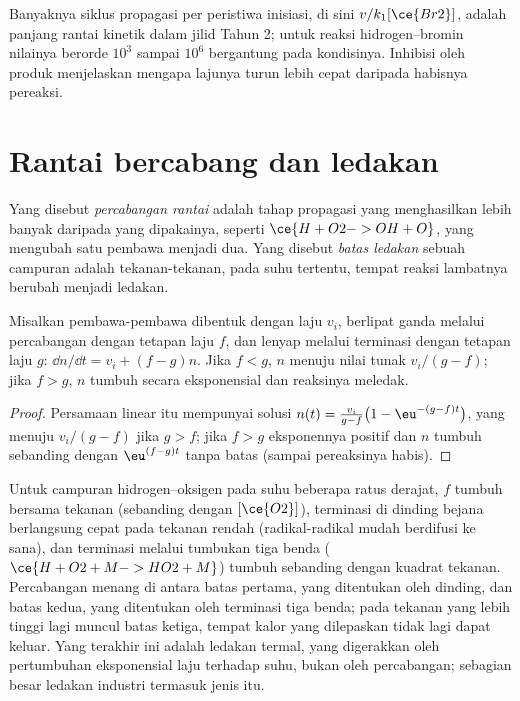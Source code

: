 Banyaknya siklus propagasi per peristiwa inisiasi, di sini $v/k_1[\ce{Br2}]$,
adalah panjang rantai kinetik dalam jilid Tahun 2; untuk reaksi
hidrogen--bromin nilainya berorde $10^3$ sampai $10^6$ bergantung pada
kondisinya. Inhibisi oleh produk menjelaskan mengapa lajunya turun lebih
cepat daripada habisnya pereaksi.

\section{Rantai bercabang dan ledakan}

\begin{definition}\label{def:b3:complex-kinetics:branching}
Yang disebut \emph{percabangan rantai} adalah tahap
propagasi yang menghasilkan  lebih banyak daripada yang
dipakainya, seperti $\ce{H + O2 -> OH + O}$, yang mengubah satu pembawa menjadi
dua. Yang disebut \emph{batas ledakan} sebuah campuran
adalah tekanan-tekanan, pada suhu tertentu, tempat reaksi lambatnya berubah
menjadi ledakan.
\end{definition}

\begin{proposition}\label{prop:b3:complex-kinetics:branching}
Misalkan pembawa-pembawa dibentuk dengan laju $v_i$, berlipat ganda melalui
percabangan dengan tetapan laju $f$, dan lenyap melalui terminasi dengan
tetapan laju $g$: $\dd n/\dd t = v_i + (f - g)n$. Jika $f < g$, $n$ menuju nilai
tunak $v_i/(g - f)$; jika $f > g$, $n$ tumbuh secara eksponensial dan reaksinya
meledak.
\end{proposition}

\begin{proof}
Persamaan linear itu mempunyai solusi $n(t) = \frac{v_i}{g - f}\bigl(1 - \eu^{-(g - f)t}\bigr)$,
yang menuju $v_i/(g - f)$ jika $g > f$; jika $f > g$ eksponennya positif dan $n$
tumbuh sebanding dengan $\eu^{(f - g)t}$ tanpa batas (sampai pereaksinya habis).
\end{proof}

Untuk campuran hidrogen--oksigen pada suhu beberapa ratus derajat, $f$ tumbuh
bersama tekanan (sebanding dengan $[\ce{O2}]$), terminasi di dinding bejana
berlangsung cepat pada tekanan rendah (radikal-radikal mudah berdifusi ke
sana), dan terminasi melalui tumbukan tiga benda ($\ce{H + O2 + M -> HO2 + M}$)
tumbuh sebanding dengan kuadrat tekanan. Percabangan menang di antara batas
pertama, yang ditentukan oleh dinding, dan batas kedua, yang ditentukan oleh
terminasi tiga benda; pada tekanan yang lebih tinggi lagi muncul batas ketiga,
tempat kalor yang dilepaskan tidak lagi dapat keluar. Yang terakhir ini adalah
ledakan termal, yang digerakkan oleh pertumbuhan eksponensial laju terhadap
suhu, bukan oleh percabangan; sebagian besar ledakan industri termasuk jenis
itu.

